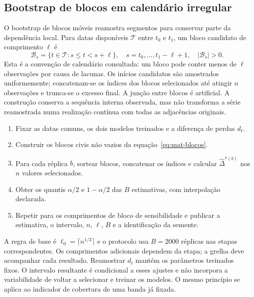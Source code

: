 \subsection{Bootstrap de blocos em calendário irregular}
\label{sec:mat-mbb}
O bootstrap de blocos móveis reamostra segmentos para conservar parte da dependência local\parencite{Kunsch1989,Lahiri2003}. Para datas disponíveis $\mathcal T$ entre $t_0$ e $t_1$, um bloco candidato de comprimento $\ell$ é
\begin{equation}
\mathcal B_s=\{t\in\mathcal T:s\leq t<s+\ell\},
\quad s=t_0,\ldots,t_1-\ell+1,
\quad |\mathcal B_s|>0.
\label{eq:mat-blocos}
\end{equation}
Esta é a convenção de calendário consultada: um bloco pode conter menos de $\ell$ observações por causa de lacunas. Os inícios candidatos são amostrados uniformemente; concatenam-se os índices dos blocos selecionados até atingir $n$ observações e trunca-se o excesso final. A junção entre blocos é artificial. A construção conserva a sequência interna observada, mas não transforma a série reamostrada numa realização contínua com todas as adjacências originais.

\begin{tcolorbox}[breakable,colback=black!2,colframe=black!45,title={Algoritmo G.1 --- Intervalo para um contraste emparelhado}]
\begin{enumerate}[leftmargin=*,nosep]
\item Fixar as datas comuns, os dois modelos treinados e a diferença de perdas $d_t$.
\item Construir os blocos civis não vazios da equação~\ref{eq:mat-blocos}.
\item Para cada réplica $b$, sortear blocos, concatenar os índices e calcular $\widehat\Delta^{*(b)}$ nos $n$ valores selecionados.
\item Obter os quantis $\alpha/2$ e $1-\alpha/2$ das $B$ estimativas, com interpolação declarada.
\item Repetir para os comprimentos de bloco de sensibilidade e publicar a estimativa, o intervalo, $n$, $\ell$, $B$ e a identificação da semente.
\end{enumerate}
\end{tcolorbox}

A regra de base é $\ell_0=\lceil n^{1/3}\rceil$ e o protocolo usa $B=2000$ réplicas nas etapas correspondentes. Os comprimentos adicionais dependem da etapa; a grelha deve acompanhar cada resultado. Reamostrar $d_t$ mantém os parâmetros treinados fixos. O intervalo resultante é condicional a esses ajustes e não incorpora a variabilidade de voltar a selecionar e treinar os modelos. O mesmo princípio se aplica ao indicador de cobertura de uma banda já fixada.


